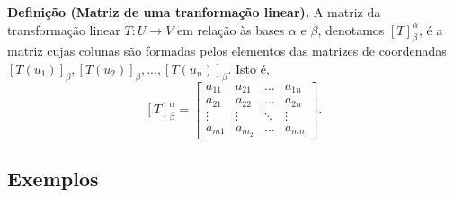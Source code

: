 \vspace{1cm}

\textbf{Definição (Matriz de uma tranformação linear).}  A matriz da transformação linear $T: U \rightarrow V$ em relação às bases $\alpha$ e $\beta$, denotamos $[T]_{\beta}^{\alpha}$, é a matriz cujas colunas são formadas pelos elementos das matrizes de coordenadas $ [T(u_1)]_{\beta},  [T(u_2)]_{\beta},..., [T(u_n)]_{\beta}$. Isto é,
\vspace{0.3cm}
$$[T]_{\beta}^{\alpha}=\left[ \begin{array}{cccc}a_{11} &a_{21} & \hdots & a_{1n} \\ a_{21} & a_{22} & \hdots & a_{2n} \\ \vdots & \vdots & \ddots & \vdots \\ a_{m1}& a_{m_2} & \hdots & a_{mn} \end{array} \right].$$


\subsection{Exemplos}


